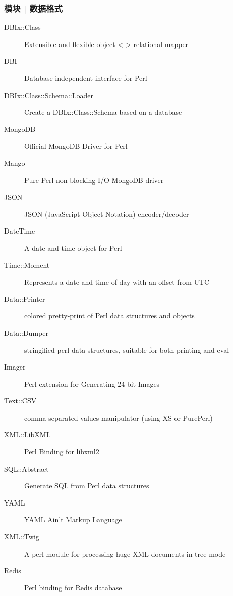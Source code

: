 \begin{frame}
  \frametitle{模块 | 数据格式}
  {\footnotesize
    \begin{description}
      \item[DBIx::Class] Extensible and flexible object <-> relational mapper
      \item[DBI] Database independent interface for Perl 
      \item[DBIx::Class::Schema::Loader] Create a DBIx::Class::Schema based on a database
      \item[MongoDB] Official MongoDB Driver for Perl
      \item[Mango] Pure-Perl non-blocking I/O MongoDB driver
      \item[JSON] JSON (JavaScript Object Notation) encoder/decoder
      \item[DateTime] A date and time object for Perl 
      \item[Time::Moment] Represents a date and time of day with an offset from UTC
      \item[Data::Printer] colored pretty-print of Perl data structures and objects
      \item[\alert{Data::Dumper}] stringified perl data structures, suitable for both printing and eval
      \item[Imager] Perl extension for Generating 24 bit Images
      \item[Text::CSV] comma-separated values manipulator (using XS or PurePerl)
      \item[XML::LibXML] Perl Binding for libxml2
      \item[SQL::Abstract] Generate SQL from Perl data structures
      \item[YAML] YAML Ain't Markup Language\texttrademark
      \item[XML::Twig] A perl module for processing huge XML documents in tree mode
      \item[Redis] Perl binding for Redis database
    \end{description}
}
\end{frame}

